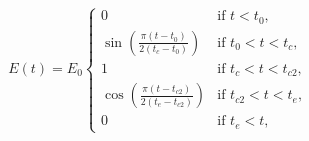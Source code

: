\documentclass{article}
\begin{document}
  \begin{equation}
    E(t)=E_0
    \begin{cases}
      0                                                   &\text{if } t<t_0,\nonumber\\
      \sin\left(\frac{\pi(t-t_0)}{2(t_c-t_0)}\right)      &\text{if } t_0<t<t_c,\nonumber\\
      1                                                   &\text{if } t_c<t<t_{c2},\nonumber\\
      \cos\left(\frac{\pi(t-t_{c2})}{2(t_e-t_{c2})}\right)      &\text{if } t_{c2}<t<t_e,\nonumber\\
      0                                                   &\text{if } t_e<t,\
    \end{cases}
\nonumber  \end{equation}
\end{document}
